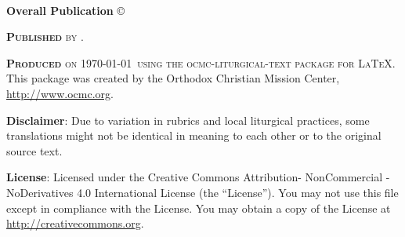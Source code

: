 \newpage
~\vfill
\thispagestyle{empty}

%

%

%

\noindent \textbf{Overall Publication} \copyright\  %

\noindent \textsc{\textbf{Published} by .} %

\noindent \textsc{\textbf{Produced} on \today\ using the ocmc-liturgical-text package for \LaTeX}. This package was created by the Orthodox Christian Mission Center, \url{http://www.ocmc.org}. 

\noindent \textbf{Disclaimer}: Due to variation in rubrics and local liturgical practices, some translations might not be identical in meaning to each other or to the original source text.

\noindent \textbf{License}: Licensed under the Creative Commons Attribution- NonCommercial - NoDerivatives 4.0 International License (the ``License''). You may not use this file except in compliance with the License. You may obtain a copy of the License at \url{http://creativecommons.org}.
